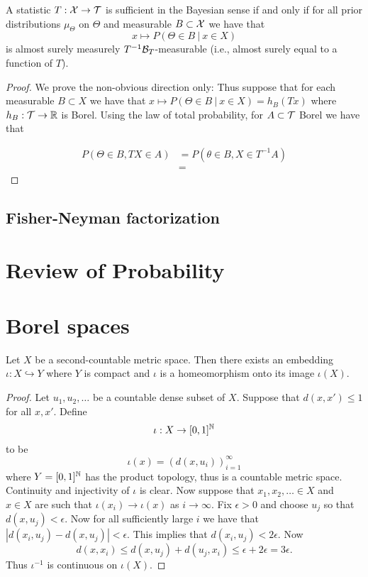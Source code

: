 \documentclass[twoside, a4paper, 10pt]{amsart}
\begin{document}
\begin{lemma} A statistic $T:\mathcal{X} \to \mathcal{T}$ is sufficient in the Bayesian sense if and only if for all prior distributions $\mu_{\Theta}$ on $\Theta$ and measurable $B \subset \mathcal{X}$ we have that $$x \mapsto P(\Theta \in B ~|~ x \in X)$$ is almost surely measurely $T^{-1}\mathcal{B}_T$-measurable (i.e., almost surely equal to a function of $T$).

\end{lemma}

\begin{proof} We prove the non-obvious direction only: Thus suppose that for each measurable $B \subset X$ we have that $x\mapsto P(\Theta \in B ~|~ x \in X) = h_B(Tx)$ where $h_B: \mathcal{T} \to \mathbb{R}$ is Borel. Using the law of total probability, for $A \subset \mathcal{T}$ Borel we have that

\begin{align*} P(\Theta \in B, TX \in A) &= P(\theta \in B, X \in T^{-1}A) \\
&= \end{align*} \end{proof}

\subsection{Fisher-Neyman factorization}

\appendix

\section{Review of Probability}

\section{Borel spaces}

\begin{lemma} Let $X$ be a second-countable metric space. Then there exists an embedding $\iota:X \hookrightarrow Y$ where $Y$ is compact and $\iota$ is a homeomorphism onto its image $\iota(X)$.

\end{lemma}

\begin{proof} Let $u_1,u_2,\ldots $ be a countable dense subset of $X$. Suppose that $d(x,x')\leq 1$ for all $x,x'$. Define $$\iota:X \to [0,1]^{\mathbb{N}}$$ to be $$\iota(x) = (d(x,u_i))_{i=1}^{\infty}$$ where $Y=[0,1]^{\mathbb{N}}$ has the product topology, thus is a countable metric space. Continuity and injectivity of $\iota$ is clear. Now suppose that $x_1,x_2,\ldots \in X$ and $x\in X$ are such that $\iota(x_i) \to \iota(x)$ as $i \to \infty$. Fix $\epsilon>0$ and choose $u_j$ so that $d(x,u_j)<\epsilon$. Now for all sufficiently large $i$ we have that $|d(x_i, u_j) - d(x,u_j)| < \epsilon$. This implies that $d(x_i,u_j) < 2\epsilon$. Now $$d(x,x_i) \leq d(x,u_j) + d(u_j,x_i) \leq \epsilon + 2\epsilon  = 3\epsilon.$$ Thus $\iota^{-1}$ is continuous on $\iota(X)$. \end{proof}
\end{document}
